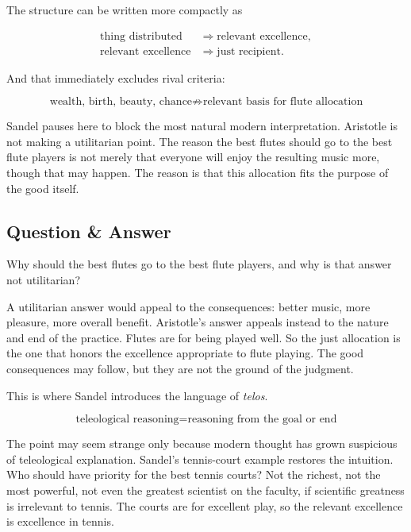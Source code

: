 The structure can be written more compactly as

\begin{align}
\text{thing distributed} &\Longrightarrow \text{relevant excellence},\\
\text{relevant excellence} &\Longrightarrow \text{just recipient}.
\end{align}

And that immediately excludes rival criteria:

\begin{equation}
\text{wealth, birth, beauty, chance}
\not\Longrightarrow
\text{relevant basis for flute allocation}
\end{equation}

Sandel pauses here to block the most natural modern interpretation. Aristotle is not making a utilitarian point. The reason the best flutes should go to the best flute players is not merely that everyone will enjoy the resulting music more, though that may happen. The reason is that this allocation fits the purpose of the good itself.

\subsection{Question \& Answer}

Why should the best flutes go to the best flute players, and why is that answer not utilitarian?

A utilitarian answer would appeal to the consequences: better music, more pleasure, more overall benefit. Aristotle's answer appeals instead to the nature and end of the practice. Flutes are for being played well. So the just allocation is the one that honors the excellence appropriate to flute playing. The good consequences may follow, but they are not the ground of the judgment.

This is where Sandel introduces the language of \emph{telos}.

\begin{equation}
\text{teleological reasoning}
=
\text{reasoning from the goal or end}
\end{equation}

The point may seem strange only because modern thought has grown suspicious of teleological explanation. Sandel's tennis-court example restores the intuition. Who should have priority for the best tennis courts? Not the richest, not the most powerful, not even the greatest scientist on the faculty, if scientific greatness is irrelevant to tennis. The courts are for excellent play, so the relevant excellence is excellence in tennis.

